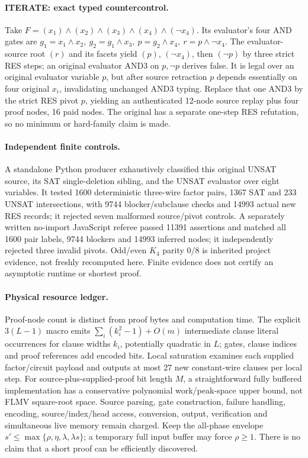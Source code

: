 \documentclass[11pt]{article}
\begin{document}
\paragraph{ITERATE: exact typed countercontrol.} Take \(F=(x_1)\land(x_2)\land(x_3)\land(x_4)\land(\neg x_4)\). Its evaluator's four AND gates are \(g_1=x_1\land x_2,\ g_2=g_1\land x_3,\ p=g_2\land x_4,\ r=p\land\neg x_4\). The evaluator-source root \((r)\) and its facets yield \((p)\), \((\neg x_4)\), then \((\neg p)\) by three strict RES steps; an original evaluator AND3 on \(p,\neg p\) derives false. It is legal over an original evaluator variable \(p\), but after source retraction \(p\) depends essentially on four original \(x_i\), invalidating unchanged AND3 typing. Replace that one AND3 by the strict RES pivot \(p\), yielding an authenticated 12-node source replay plus four proof nodes, 16 paid nodes. The original has a separate one-step RES refutation, so no minimum or hard-family claim is made.

\paragraph{Independent finite controls.} A standalone Python producer exhaustively classified this original UNSAT source, its SAT single-deletion sibling, and the UNSAT evaluator over eight variables. It tested 1600 deterministic three-wire factor pairs, 1367 SAT and 233 UNSAT intersections, with 9744 blocker/subclause checks and 14993 actual new RES records; it rejected seven malformed source/pivot controls. A separately written no-import JavaScript referee passed 11391 assertions and matched all 1600 pair labels, 9744 blockers and 14993 inferred nodes; it independently rejected three invalid pivots. Odd/even \(K_4\) parity 0/8 is inherited project evidence, not freshly recomputed here. Finite evidence does not certify an asymptotic runtime or shortest proof.

\paragraph{Physical resource ledger.} Proof-node count is distinct from proof bytes and computation time. The explicit \(3(L-1)\) macro emits \(\sum_i(k_i^2-1)+O(m)\) intermediate clause literal occurrences for clause widths \(k_i\), potentially quadratic in \(L\); gates, clause indices and proof references add encoded bits. Local saturation examines each supplied factor/circuit payload and outputs at most 27 new constant-wire clauses per local step. For source-plus-supplied-proof bit length \(M\), a straightforward fully buffered implementation has a conservative polynomial work/peak-space upper bound, not FLMV square-root space. Source parsing, gate construction, failure handling, encoding, source/index/head access, conversion, output, verification and simultaneous live memory remain charged. Keep the all-phase envelope \(s'\le\max\{\rho,\eta,\lambda,\lambda s\}\); a temporary full input buffer may force \(\rho\ge1\). There is no claim that a short proof can be efficiently discovered.
\end{document}
